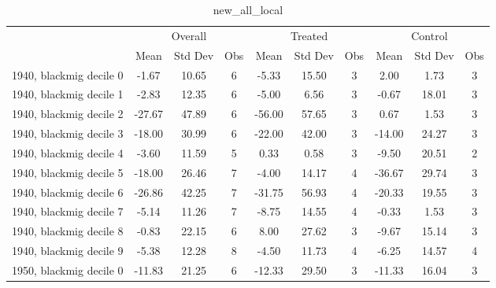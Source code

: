 \begin{table}[htbp]\centering
\def\sym#1{\ifmmode^{#1}\else\(^{#1}\)\fi}
\caption{new\_all\_local \label{tab1}}
\begin{tabular}{l*{3}{ccc}}
\toprule
                    &\multicolumn{3}{c}{Overall}           &\multicolumn{3}{c}{Treated}           &\multicolumn{3}{c}{Control}           \\
                    &        Mean&     Std Dev&         Obs&        Mean&     Std Dev&         Obs&        Mean&     Std Dev&         Obs\\
\midrule
1940, blackmig decile 0&       -1.67&       10.65&           6&       -5.33&       15.50&           3&        2.00&        1.73&           3\\
1940, blackmig decile 1&       -2.83&       12.35&           6&       -5.00&        6.56&           3&       -0.67&       18.01&           3\\
1940, blackmig decile 2&      -27.67&       47.89&           6&      -56.00&       57.65&           3&        0.67&        1.53&           3\\
1940, blackmig decile 3&      -18.00&       30.99&           6&      -22.00&       42.00&           3&      -14.00&       24.27&           3\\
1940, blackmig decile 4&       -3.60&       11.59&           5&        0.33&        0.58&           3&       -9.50&       20.51&           2\\
1940, blackmig decile 5&      -18.00&       26.46&           7&       -4.00&       14.17&           4&      -36.67&       29.74&           3\\
1940, blackmig decile 6&      -26.86&       42.25&           7&      -31.75&       56.93&           4&      -20.33&       19.55&           3\\
1940, blackmig decile 7&       -5.14&       11.26&           7&       -8.75&       14.55&           4&       -0.33&        1.53&           3\\
1940, blackmig decile 8&       -0.83&       22.15&           6&        8.00&       27.62&           3&       -9.67&       15.14&           3\\
1940, blackmig decile 9&       -5.38&       12.28&           8&       -4.50&       11.73&           4&       -6.25&       14.57&           4\\
1950, blackmig decile 0&      -11.83&       21.25&           6&      -12.33&       29.50&           3&      -11.33&       16.04&           3\\

\end{tabular}
\end{table}
